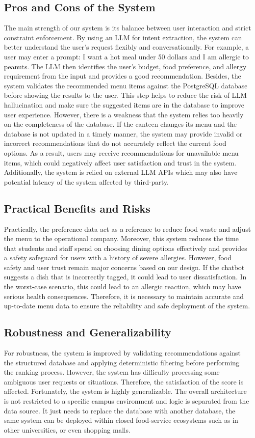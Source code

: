 \documentclass{article}
\begin{document}
\subsection{Pros and Cons of the System} 
The main strength of our system is its balance between user interaction and strict constraint enforcement. By using an LLM for intent extraction, the system can better understand the user's request flexibly and conversationally. For example, a user may enter a prompt: I want a hot meal under 50 dollars and I am allergic to peanuts. The LLM then identifies the user's budget, food preference, and allergy requirement from the input and provides a good recommendation. Besides, the system validates the recommended menu items against the PostgreSQL database before showing the results to the user. This step helps to reduce the risk of LLM hallucination and make sure the suggested items are in the database to improve user experience. However, there is a weakness that the system relies too heavily on the completeness of the database. If the canteen changes its menu and the database is not updated in a timely manner, the system may provide invalid or incorrect recommendations that do not accurately reflect the current food options. As a result, users may receive recommendations for unavailable menu items, which could negatively affect user satisfaction and trust in the system. Additionally, the system is relied on external LLM APIs which may also have potential latency of the system affected by third-party.
\subsection{Practical Benefits and Risks}
Practically, the preference data act as a reference to reduce food waste and adjust the menu to the operational company. Moreover, this system reduces the time that students and staff spend on choosing dining options effectively and provides a safety safeguard for users with a history of severe allergies. However, food safety and user trust remain major concerns based on our design. If the chatbot suggests a dish that is incorrectly tagged, it could lead to user dissatisfaction. In the worst-case scenario, this could lead to an allergic reaction, which may have serious health consequences. Therefore, it is necessary to maintain accurate and up-to-date menu data to ensure the reliability and safe deployment of the system.
\subsection{Robustness and Generalizability}
For robustness, the system is improved by validating recommendations against the structured database and applying deterministic filtering before performing the ranking process. However, the system has difficulty processing some ambiguous user requests or situations. Therefore, the satisfaction of the score is affected. Fortunately, the system is highly generalizable. The overall architecture is not restricted to a specific campus environment and logic is separated from the data source. It just needs to replace the database with another database, the same system can be deployed within closed food-service ecosystems such as in other universities, or even shopping malls.
\end{document}
